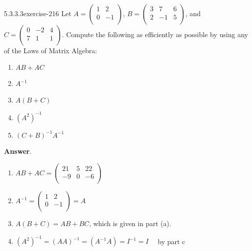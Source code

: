 \documentclass[twoside,10pt,]{book}
\numberwithin{equation}{section}
\begin{document}
\begin{divisionsolution}{5.3.3.3}{}{exercise-216}%
\hypertarget{p-1866}{}%
Let \(A = \left(
\begin{array}{cc}
1 & 2 \\
0 & -1 \\
\end{array}
\right)\), \(B= \left(
\begin{array}{ccc}
3 & 7 & 6 \\
2 & -1 & 5 \\
\end{array}
\right)\), and \(C= \left(
\begin{array}{ccc}
0 & -2 & 4 \\
7 & 1 & 1 \\
\end{array}
\right)\). Compute the following as efficiently as possible by using any of the Laws of Matrix Algebra:%
\par
\hypertarget{p-1867}{}%
\leavevmode%
\begin{enumerate}[label=(\alph*)]
\item\hypertarget{li-992}{}\hypertarget{p-1868}{}%
\(A B + A C\)%
\item\hypertarget{li-993}{}\hypertarget{p-1869}{}%
\(A^{-1}\)%
\item\hypertarget{li-994}{}\hypertarget{p-1870}{}%
\(A(B + C)\)%
\item\hypertarget{li-995}{}\hypertarget{p-1871}{}%
\(\left(A^2\right)^{-1}\)%
\item\hypertarget{li-996}{}\hypertarget{p-1872}{}%
\((C + B)^{-1}A^{-1}\)%
\end{enumerate}
%
\par\smallskip%
\noindent\textbf{Answer}.\quad%
\hypertarget{p-1873}{}%
\leavevmode%
\begin{enumerate}[label=(\alph*)]
\item\hypertarget{li-997}{}\hypertarget{p-1874}{}%
\(AB+AC=\left(
\begin{array}{ccc}
21 & 5 & 22 \\
-9 & 0 & -6 \\
\end{array}
\right)\)%
\item\hypertarget{li-998}{}\hypertarget{p-1875}{}%
\(A^{-1}=\left(
\begin{array}{cc}
1 & 2 \\
0 & -1 \\
\end{array}
\right)=A\)%
\item\hypertarget{li-999}{}\hypertarget{p-1876}{}%
\(A(B+C)=A B+ B C\), which is given in part (a).%
\item\hypertarget{li-1000}{}\hypertarget{p-1877}{}%
\(\left(A^2\right)^{-1}=(AA)^{-1}=(A^{-1}A)=I^{-1}=I \quad \) by part c%
\end{enumerate}
%
\end{divisionsolution}%
\end{document}
